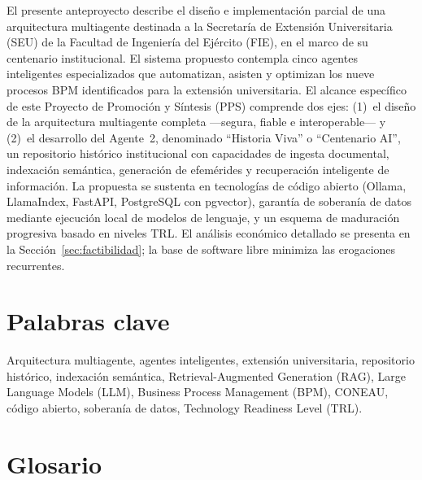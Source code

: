 \documentclass[a4paper, 12pt]{article}
\begin{document}
El presente anteproyecto describe el dise\~no e implementaci\'on parcial de una arquitectura multiagente destinada a la Secretar\'ia de Extensi\'on Universitaria (SEU) de la Facultad de Ingenier\'ia del Ej\'ercito (FIE), en el marco de su centenario institucional. El sistema propuesto contempla cinco agentes inteligentes especializados que automatizan, asisten y optimizan los nueve procesos BPM identificados para la extensi\'on universitaria. El alcance espec\'ifico de este Proyecto de Promoci\'on y S\'intesis (PPS) comprende dos ejes: (1)~el dise\~no de la arquitectura multiagente completa ---segura, fiable e interoperable--- y (2)~el desarrollo del Agente~2, denominado ``Historia Viva'' o ``Centenario AI'', un repositorio hist\'orico institucional con capacidades de ingesta documental, indexaci\'on sem\'antica, generaci\'on de efem\'erides y recuperaci\'on inteligente de informaci\'on. La propuesta se sustenta en tecnolog\'ias de c\'odigo abierto (Ollama, LlamaIndex, FastAPI, PostgreSQL con pgvector), garant\'ia de soberan\'ia de datos mediante ejecuci\'on local de modelos de lenguaje, y un esquema de maduraci\'on progresiva basado en niveles TRL. El an\'alisis econ\'omico detallado se presenta en la Secci\'on~\ref{sec:factibilidad}; la base de software libre minimiza las erogaciones recurrentes.

\section{Palabras clave}

Arquitectura multiagente, agentes inteligentes, extensi\'on universitaria, repositorio hist\'orico, indexaci\'on sem\'antica, Retrieval-Augmented Generation (RAG), Large Language Models (LLM), Business Process Management (BPM), CONEAU, c\'odigo abierto, soberan\'ia de datos, Technology Readiness Level (TRL).

\section{Glosario}
\end{document}
